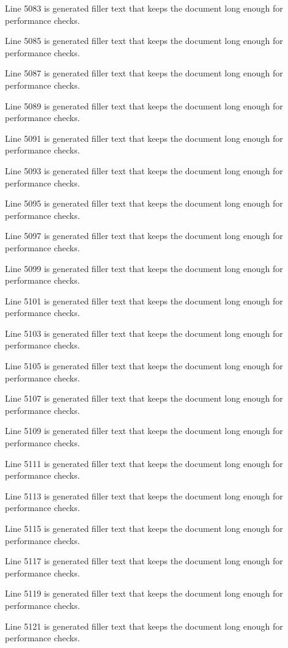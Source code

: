 Line 5083 is generated filler text that keeps the document long enough for performance checks.

Line 5085 is generated filler text that keeps the document long enough for performance checks.

Line 5087 is generated filler text that keeps the document long enough for performance checks.

Line 5089 is generated filler text that keeps the document long enough for performance checks.

Line 5091 is generated filler text that keeps the document long enough for performance checks.

Line 5093 is generated filler text that keeps the document long enough for performance checks.

Line 5095 is generated filler text that keeps the document long enough for performance checks.

Line 5097 is generated filler text that keeps the document long enough for performance checks.

Line 5099 is generated filler text that keeps the document long enough for performance checks.

Line 5101 is generated filler text that keeps the document long enough for performance checks.

Line 5103 is generated filler text that keeps the document long enough for performance checks.

Line 5105 is generated filler text that keeps the document long enough for performance checks.

Line 5107 is generated filler text that keeps the document long enough for performance checks.

Line 5109 is generated filler text that keeps the document long enough for performance checks.

Line 5111 is generated filler text that keeps the document long enough for performance checks.

Line 5113 is generated filler text that keeps the document long enough for performance checks.

Line 5115 is generated filler text that keeps the document long enough for performance checks.

Line 5117 is generated filler text that keeps the document long enough for performance checks.

Line 5119 is generated filler text that keeps the document long enough for performance checks.

Line 5121 is generated filler text that keeps the document long enough for performance checks.

